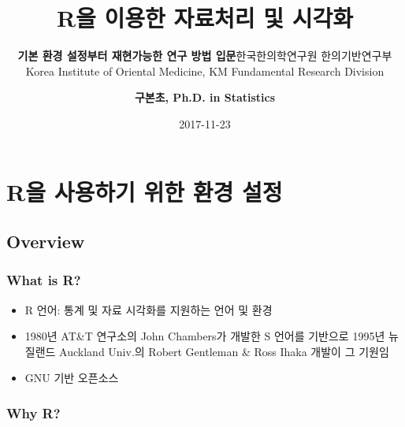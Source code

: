 \documentclass[12pt,a4paper]{book}
\title{\textbf{\LARGE R을 이용한 자료처리 및 시각화}}
\subtitle{\textbf{\Large 기본 환경 설정부터 재현가능한 연구 방법 입문}\vspace{2cm}\linebreak 한국한의학연구원
한의기반연구부\linebreak Korea Institute of Oriental Medicine, KM
Fundamental Research Division \vspace{2cm}}
\author{\textbf{\Large 구본초, Ph.D. in Statistics}}
\date{2017-11-23}
\theoremstyle{definition}
\theoremstyle{definition}
\theoremstyle{definition}
\theoremstyle{remark}
\begin{document}
\maketitle

{
\hypersetup{linkcolor=black}
\setcounter{tocdepth}{1}
\tableofcontents
}
\chapter{R을 사용하기 위한 환경 설정}\label{r----}

\section{Overview}\label{overview}

\subsection{What is R?}\label{what-is-r}

\begin{itemize}
\item
  R 언어: 통계 및 자료 시각화를 지원하는 언어 및 환경
\item
  1980년 AT\&T 연구소의 John Chambers가 개발한 S 언어를 기반으로 1995년
  뉴질랜드 Auckland Univ.의 Robert Gentleman \& Ross Ihaka 개발이 그
  기원임
\item
  GNU 기반 오픈소스
\end{itemize}

\subsection{Why R?}\label{why-r}
\end{document}
